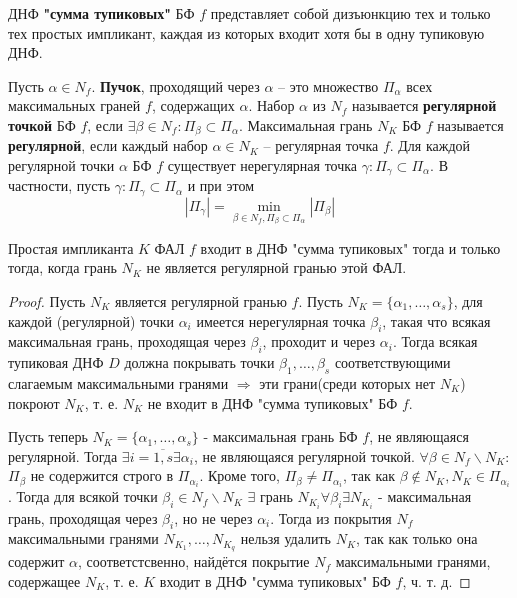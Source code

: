 \documentclass[11pt]{article}
\newcounter{th}\setcounter{th}{0}
\newcounter{stnmt}\setcounter{stnmt}{0}
\def\st{\par\smallskip\refstepcounter{stnmt}\textbf{\arabic{stnmt}}}
\newtheorem*{Statement}{Утверждение \st}
\begin{document}
ДНФ \textbf{"сумма тупиковых"} БФ \(f\) представляет собой дизъюнкцию тех и только тех простых импликант,
каждая из которых входит хотя бы в одну тупиковую ДНФ.

Пусть \(\alpha \in N_f\). \textbf{Пучок}, проходящий через \(\alpha\) -- это множество \(\Pi_{\alpha}\)
всех максимальных граней \(f\), содержащих \(\alpha\). Набор \(\alpha\) из \(N_f\) называется
\textbf{регулярной точкой} БФ \(f\), если \(\exists \beta \in N_f: \Pi_{\beta} \subset \Pi_{\alpha}\).
Максимальная грань \(N_K\) БФ \(f\) называется \textbf{регулярной}, если каждый набор \(\alpha \in N_K\) --
регулярная точка \(f\). Для каждой регулярной точки \(\alpha\) БФ \(f\) существует нерегулярная
точка \(\gamma: \Pi_{\gamma} \subset \Pi_{\alpha}\). В частности, пусть
\(\gamma: \Pi_{\gamma} \subset \Pi_{\alpha}\) и при этом
\begin{equation*}
|\Pi_{\gamma}| = \min_{\beta \in N_f, \Pi_{\beta} \subset \Pi_{\alpha}}|\Pi_{\beta}|
\end{equation*}
\begin{Statement}
Простая импликанта $K$ ФАЛ $f$ входит в ДНФ "сумма тупиковых" тогда и только тогда, когда
грань $N_K$ не является регулярной гранью этой ФАЛ.
\end{Statement}
\begin{proof}
Пусть $N_K$ является регулярной гранью $f$. Пусть $N_K = \{\alpha_1, \ldots, \alpha_s\}$, для
каждой (регулярной) точки $\alpha_i$ имеется нерегулярная точка $\beta_i$, такая что всякая
максимальная грань, проходящая через $\beta_i$, проходит и через $\alpha_i$. Тогда всякая
тупиковая ДНФ $D$ должна покрывать точки $\beta_1, \ldots, \beta_s$ соответствующими слагаемым
максимальными гранями $\Rightarrow$ эти грани(среди которых нет $N_K$) покроют $N_K$, т. е.
$N_K$ не входит в ДНФ "сумма тупиковых" БФ $f$.

Пусть теперь $N_K = \{\alpha_1, \ldots, \alpha_s\}$ - максимальная грань БФ $f$, не являющаяся
регулярной. Тогда $\exists i = \overline{1, s} \exists \alpha_i$, не являющаяся регулярной
точкой. $\forall \beta \in N_f \backslash N_K$: $\Pi_{\beta}$ не содержится строго в
$\Pi_{\alpha_i}$. Кроме того, $\Pi_{\beta} \neq \Pi_{\alpha_i}$, так как
$\beta \notin N_K, N_K \in \Pi_{\alpha_i}$. Тогда для всякой точки $\beta_i \in N_f \backslash N_K$
$\exists$ грань $N_{K_i} \forall \beta_i \exists N_{K_i}$ - максимальная грань, проходящая через
$\beta_i$, но не через $\alpha_i$. Тогда из покрытия $N_f$ максимальными гранями
$N_{K_1}, \ldots, N_{K_q}$ нельзя удалить $N_K$, так как только она содержит $\alpha$,
соответстсвенно, найдётся покрытие $N_f$ максимальными гранями, содержащее $N_K$, т. е. $K$
входит в ДНФ "сумма тупиковых" БФ $f$, ч. т. д.
\end{proof}
\end{document}
